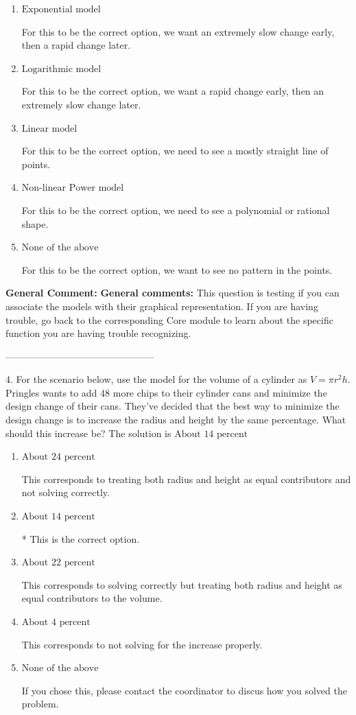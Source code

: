 \documentclass{extbook}[14pt]
\begin{document}
\begin{enumerate}[label=\Alph*.] 
\item $ \text{Exponential model} $ 

 For this to be the correct option, we want an extremely slow change early, then a rapid change later. 
\item $ \text{Logarithmic model} $ 

 For this to be the correct option, we want a rapid change early, then an extremely slow change later. 
\item $ \text{Linear model} $ 

 For this to be the correct option, we need to see a mostly straight line of points. 
\item $ \text{Non-linear Power model} $ 

 For this to be the correct option, we need to see a polynomial or rational shape. 
\item $ \text{None of the above} $ 

 For this to be the correct option, we want to see no pattern in the points. 
\end{enumerate} 
 
\textbf{General Comment:} \textbf{General comments:} This question is testing if you can associate the models with their graphical representation. If you are having trouble, go back to the corresponding Core module to learn about the specific function you are having trouble recognizing. 

-----------------------------------------------

4. For the scenario below, use the model for the volume of a cylinder as $V = \pi r^2 h$.
Pringles wants to add 48  more chips to their cylinder cans and minimize the design change of their cans. They've decided that the best way to minimize the design change is to increase the radius and height by the same percentage. What should this increase be? 
The solution is $ \text{About } 14 \text{ percent} $ 

\begin{enumerate}[label=\Alph*.] 
\item $ \text{About } 24 \text{ percent} $ 

 This corresponds to treating both radius and height as equal contributors and not solving correctly. 
\item $ \text{About } 14 \text{ percent} $ 

 * This is the correct option. 
\item $ \text{About } 22 \text{ percent} $ 

 This corresponds to solving correctly but treating both radius and height as equal contributors to the volume. 
\item $ \text{About } 4 \text{ percent} $ 

 This corresponds to not solving for the increase properly. 
\item $ \text{None of the above} $ 

 If you chose this, please contact the coordinator to discus how you solved the problem. 
\end{enumerate} 
 
\end{document}
